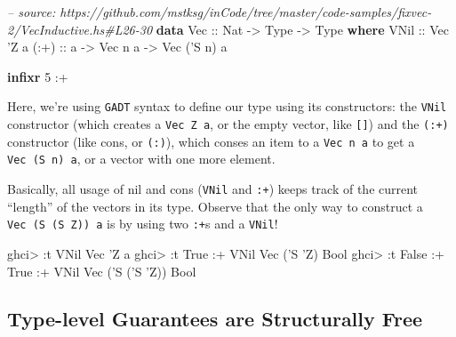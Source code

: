 \documentclass[]{article}
\newenvironment{Shaded}{}{}
\newcommand{\KeywordTok}[1]{\textcolor[rgb]{0.00,0.44,0.13}{\textbf{#1}}}
\newcommand{\DataTypeTok}[1]{\textcolor[rgb]{0.56,0.13,0.00}{#1}}
\newcommand{\DecValTok}[1]{\textcolor[rgb]{0.25,0.63,0.44}{#1}}
\newcommand{\CharTok}[1]{\textcolor[rgb]{0.25,0.44,0.63}{#1}}
\newcommand{\CommentTok}[1]{\textcolor[rgb]{0.38,0.63,0.69}{\textit{#1}}}
\newcommand{\OtherTok}[1]{\textcolor[rgb]{0.00,0.44,0.13}{#1}}
\newcommand{\FunctionTok}[1]{\textcolor[rgb]{0.02,0.16,0.49}{#1}}
\newcommand{\NormalTok}[1]{#1}
\begin{document}
\begin{Shaded}
\begin{Highlighting}[]
\CommentTok{-- source: https://github.com/mstksg/inCode/tree/master/code-samples/fixvec-2/VecInductive.hs#L26-30}
\KeywordTok{data} \DataTypeTok{Vec}\OtherTok{ ::} \DataTypeTok{Nat} \OtherTok{->} \DataTypeTok{Type} \OtherTok{->} \DataTypeTok{Type} \KeywordTok{where}
    \DataTypeTok{VNil}\OtherTok{ ::} \DataTypeTok{Vec} \CharTok{'Z a}
\OtherTok{    (:+) ::}\NormalTok{ a }\OtherTok{->} \DataTypeTok{Vec}\NormalTok{ n a }\OtherTok{->} \DataTypeTok{Vec}\NormalTok{ (}\CharTok{'S n) a}

\KeywordTok{infixr} \DecValTok{5} \FunctionTok{:+}
\end{Highlighting}
\end{Shaded}

Here, we're using \texttt{GADT} syntax to define our type using its
constructors: the \texttt{VNil} constructor (which creates a
\texttt{Vec\ \textquotesingle{}Z\ a}, or the empty vector, like \texttt{{[}{]}})
and the \texttt{(:+)} constructor (like cons, or \texttt{(:)}), which conses an
item to a \texttt{Vec\ n\ a} to get a \texttt{Vec\ (\textquotesingle{}S\ n)\ a},
or a vector with one more element.

Basically, all usage of nil and cons (\texttt{VNil} and \texttt{:+}) keeps track
of the current ``length'' of the vectors in its type. Observe that the only way
to construct a
\texttt{Vec\ (\textquotesingle{}S\ (\textquotesingle{}S\ \textquotesingle{}Z))\ a}
is by using two \texttt{:+}s and a \texttt{VNil}!

\begin{Shaded}
\begin{Highlighting}[]
\NormalTok{ghci}\FunctionTok{>} \FunctionTok{:}\NormalTok{t }\DataTypeTok{VNil}
\DataTypeTok{Vec} \CharTok{'Z a}
\NormalTok{ghci}\FunctionTok{>} \FunctionTok{:}\NormalTok{t }\DataTypeTok{True} \FunctionTok{:+} \DataTypeTok{VNil}
\DataTypeTok{Vec}\NormalTok{ (}\CharTok{'S '}\DataTypeTok{Z}\NormalTok{) }\DataTypeTok{Bool}
\NormalTok{ghci}\FunctionTok{>} \FunctionTok{:}\NormalTok{t }\DataTypeTok{False} \FunctionTok{:+} \DataTypeTok{True} \FunctionTok{:+} \DataTypeTok{VNil}
\DataTypeTok{Vec}\NormalTok{ (}\CharTok{'S ('}\DataTypeTok{S} \CharTok{'Z)) Bool}
\end{Highlighting}
\end{Shaded}

\subsection{Type-level Guarantees are Structurally
Free}\label{type-level-guarantees-are-structurally-free}
\end{document}
